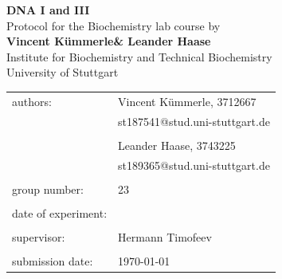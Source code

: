 \documentclass[a4paper,12pt,bibliography=totocnumbered,parskip=half,headsepline]{scrartcl}
\makeatletter
\newcommand{\VERSUCHSDATUM}{\DTMdisplaydate{2026}{3}{10--12}{-1}}
\newcommand{\PROTOKOLLDATUM}{\today}
\newcommand{\VerfasserEINS}{Vincent Kümmerle}
\newcommand{\MatNoEINS}{3712667}
\newcommand{\EmailEINS}{st187541@stud.uni-stuttgart.de}
\newcommand{\VerfasserZWEI}{Leander Haase}
\newcommand{\MatNoZWEI}{3743225}
\newcommand{\EmailZWEI}{st189365@stud.uni-stuttgart.de}
\newcommand{\BETREUER}{Hermann Timofeev}
\newcommand{\GRUPPENNR}{23}
\newcommand{\VERSUCHSNAME}{DNA I and III}
\makeatother
\begin{document}
\thispagestyle{empty}


\begin{titlepage}

\begin{center}
\Huge{\textbf{\VERSUCHSNAME}}\\
\vspace{10mm}%
\Large{Protocol for the Biochemistry lab course by \\ \textbf{\VerfasserEINS\;\& \VerfasserZWEI}}\\
\vspace{10mm}
\Large{Institute for Biochemistry and Technical Biochemistry}\\
\Large{University of Stuttgart}\\
\end{center}
\vspace{0cm}
\begin{center}
\begin{tabular}{ll}
\large{authors:}		& \large{\VerfasserEINS,} \large{\MatNoEINS} \\
 						& \large{\EmailEINS} \\
						\vspace{0cm}\\
						& \large{\VerfasserZWEI,} \large{\MatNoZWEI} \\
                        & \large{\EmailZWEI} \\
						\vspace{0cm}\\
\large{group number:}	& \large{\GRUPPENNR} \\
\vspace{0cm}\\
\large{date of experiment:}	& \large{\VERSUCHSDATUM} \\
\vspace{0cm}\\
\large{supervisor:}		& \large{\BETREUER} \\
\vspace{0cm}\\
\large{submission date:} & \large{\PROTOKOLLDATUM}
\end{tabular}
\end{center}

\vspace{1cm}


\end{titlepage}


\thispagestyle{empty}

\tableofcontents 
\end{document}
